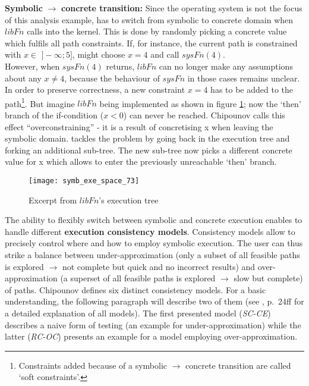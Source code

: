\medskip
\textbf{Symbolic} $\rightarrow$ \textbf{concrete transition:}
Since the operating system is not the focus of this analysis example, \sse has to switch from symbolic to concrete domain when $libFn$ calls into the kernel.
This is done by randomly picking a concrete value which fulfils all path constraints.
If, for instance, the current path is constrained with $x \in$ $]-\infty;5]$, \sse might choose $x=4$ and call $sysFn(4)$.\\
However, when $sysFn(4)$ returns, $libFn$ can no longer make any assumptions about any $x \neq 4$, because the behaviour of $sysFn$ in those cases remains unclear.
In order to preserve correctness, a new constraint $x = 4$ has to be added to the path\footnote{Constraints added because of a symbolic $\rightarrow$ concrete transition are called `soft constraints'.}.
But imagine $libFn$ being implemented as shown in figure \ref{fig:ssetree2}; now the `then' branch of the if-condition ($x < 0$) can never be reached.
Chipounov calls this effect ``overconstraining'' \cite{chip14s2e} - it is a result of concretising x when leaving the symbolic domain.
\sse tackles the problem by going back in the execution tree and forking an additional sub-tree.
The new sub-tree now picks a different concrete value for x which allows to enter the previously unreachable `then' branch.

\begin{figure}
\texttt{[image: symb\_exe\_space\_73]}
\caption{Excerpt from $libFn$'s execution tree \cite{chip12s2e}}
\label{fig:ssetree2}
\end{figure}


\medskip
The ability to flexibly switch between symbolic and concrete execution enables \sse to handle different \textbf{execution consistency models}.
Consistency models allow to precisely control where and how to employ symbolic execution.
The user can thus strike a balance between under-approximation (only a subset of all feasible paths is explored $\rightarrow$ not complete but quick and no incorrect results) and over-approximation (a superset of all feasible paths is explored $\rightarrow$ slow but complete) of paths.
Chipounov defines six distinct consistency models.
For a basic understanding, the following paragraph will describe two of them (see \cite{chip14s2e}, p.~24ff for a detailed explanation of all models).
The first presented model (\textit{SC-CE}) describes a naive form of testing (an example for under-approximation) while the latter (\textit{RC-OC}) presents an example for a model employing over-approximation.

